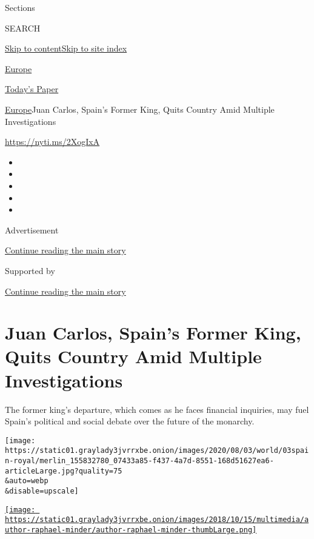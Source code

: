 Sections

SEARCH

\protect\hyperlink{site-content}{Skip to
content}\protect\hyperlink{site-index}{Skip to site index}

\href{https://www.nytimes3xbfgragh.onion/section/world/europe}{Europe}

\href{https://myaccount.nytimes3xbfgragh.onion/auth/login?response_type=cookie\&client_id=vi}{}

\href{https://www.nytimes3xbfgragh.onion/section/todayspaper}{Today's
Paper}

\href{/section/world/europe}{Europe}\textbar{}Juan Carlos, Spain's
Former King, Quits Country Amid Multiple Investigations

\url{https://nyti.ms/2XogIxA}

\begin{itemize}
\item
\item
\item
\item
\item
\end{itemize}

Advertisement

\protect\hyperlink{after-top}{Continue reading the main story}

Supported by

\protect\hyperlink{after-sponsor}{Continue reading the main story}

\hypertarget{juan-carlos-spains-former-king-quits-country-amid-multiple-investigations}{%
\section{Juan Carlos, Spain's Former King, Quits Country Amid Multiple
Investigations}\label{juan-carlos-spains-former-king-quits-country-amid-multiple-investigations}}

The former king's departure, which comes as he faces financial
inquiries, may fuel Spain's political and social debate over the future
of the monarchy.

\texttt{[image: https://static01.graylady3jvrrxbe.onion/images/2020/08/03/world/03spain-royal/merlin\_155832780\_07433a85-f437-4a7d-8551-168d51627ea6-articleLarge.jpg?quality=75\\\&auto=webp\\\&disable=upscale]}

\href{https://www.nytimes3xbfgragh.onion/by/raphael-minder}{\texttt{[image: https://static01.graylady3jvrrxbe.onion/images/2018/10/15/multimedia/author-raphael-minder/author-raphael-minder-thumbLarge.png]}}

